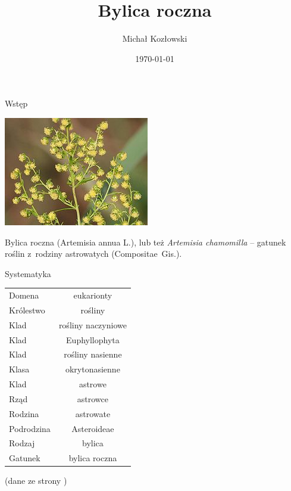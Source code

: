\documentclass{beamer}
\title{Bylica roczna}
\author{Michał Kozłowski}
\date{\today}
\institute{UWM}
\begin{document}
\frame{\titlepage}
	
\begin{frame}{Wstęp}
	\begin{center}
	\includegraphics[scale = 0.35]{grafika/ilustracja.jpeg}
	\end{center}
	Bylica roczna (Artemisia annua L.), lub też \textit{Artemisia chamomilla}\cite{site2} – gatunek roślin z~rodziny astrowatych (Compositae~Gis.).
\end{frame}

\begin{frame}{Systematyka}
	\centering
	\begin{table}
		\begin{tabular}{lc}
		Domena&eukarionty\\ \pause
		Królestwo&rośliny\\ \pause
		Klad&rośliny naczyniowe\\ \pause
		Klad&Euphyllophyta\\ \pause
		Klad&rośliny nasienne\\ \pause
		Klasa&okrytonasienne\\ \pause
		Klad&astrowe\\ \pause
		Rząd&astrowce\\ \pause
		Rodzina&astrowate\\ \pause
		Podrodzina&Asteroideae\\ \pause
		Rodzaj&bylica\\ \pause
		Gatunek&bylica roczna\\
		\end{tabular}
	\end{table}
	(dane ze strony \cite{site1})
\end{frame}
\end{document}
